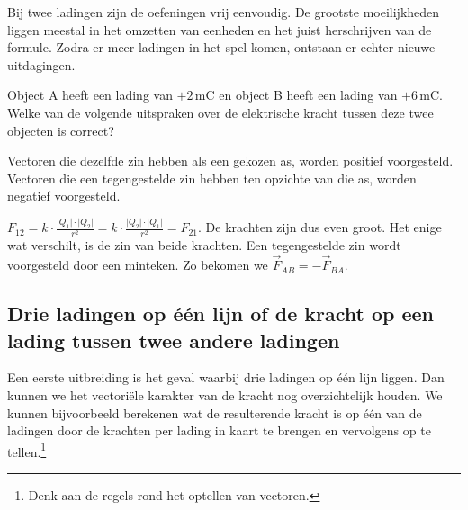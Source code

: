 \documentclass{ximera}
\begin{document}
Bij twee ladingen zijn de oefeningen vrij eenvoudig. De grootste moeilijkheden liggen meestal in het omzetten van eenheden en het juist herschrijven van de formule. Zodra er meer ladingen in het spel komen, ontstaan er echter nieuwe uitdagingen.

\begin{question}\label{q:actiereactie}\nl
    Object A heeft een lading van $+2 \, \mathrm{mC}$ en object B heeft een lading van $+6 \, \mathrm{mC}$. Welke van de volgende uitspraken over de elektrische kracht tussen deze twee objecten is correct?
    
    \begin{hint}
        Vectoren die dezelfde zin hebben als een gekozen as, worden positief voorgesteld. Vectoren die een tegengestelde zin hebben ten opzichte van die as, worden negatief voorgesteld.
    \end{hint}

    \begin{multipleChoice}
    \end{multipleChoice}
        
    \begin{solution}\nl
        $F_{12}=k \cdot \frac{\lvert Q_1\rvert \cdot \lvert Q_2\rvert}{r^{2}}=k \cdot \frac{\lvert Q_2\rvert \cdot \lvert Q_1\rvert}{r^{2}}=F_{21}$. De krachten zijn dus even groot. Het enige wat verschilt, is de zin van beide krachten. Een tegengestelde zin wordt voorgesteld door een minteken. Zo bekomen we $\vec{F}_{AB} = -\vec{F}_{BA}$.
    \end{solution}
\end{question}


\subsection{Drie ladingen op één lijn of de kracht op een lading tussen twee andere ladingen}
Een eerste uitbreiding is het geval waarbij drie ladingen op één lijn liggen. Dan kunnen we het vectoriële karakter van de kracht nog overzichtelijk houden. We kunnen bijvoorbeeld berekenen wat de resulterende kracht is op één van de ladingen door de krachten per lading in kaart te brengen en vervolgens op te tellen.\footnote{Denk aan de regels rond het optellen van vectoren.}
\end{document}

